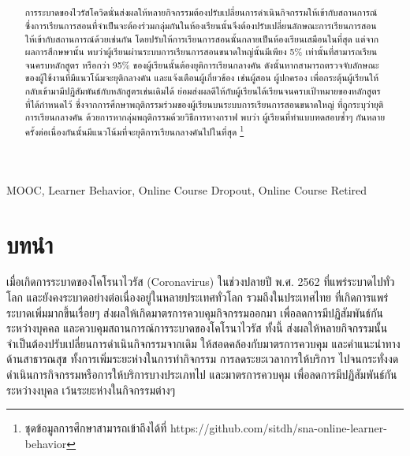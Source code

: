 \documentclass[conference]{IEEEtran}
\title{ \SNATopic }
\author{
    \IEEEauthorblockN{\Me} \newline
    \IEEEauthorblockA{\MyEmail} \newline
    \IEEEauthorblockA{ภาคการศึกษาที่ 2 ประจำปีการศึกษา 2563} \newline
    \IEEEauthorblockA{ภาควิชาวิทยาการคอมพิวเตอร์ คณะวิทยาศาสตร์} \newline
    \IEEEauthorblockA{มหาวิทยาลัยศรีนครินทรวิโรฒ ประสานมิตร}
}
\def\moocs{การเรียนการสอนขนาดใหญ่}
\def\MOOCs{ระบบ{\moocs}}
\def\dropout{ยุติการเรียนกลางคัน}
\begin{document}
    \maketitle

    \begin{abstract}
        การระบาดของไวรัสโควิดนั่นส่งผลให้หลายกิจกรรมต้องปรับเปลี่ยนการดำเนินกิจกรรมให้เข้ากับสถานการณ์
        ซึ่งการเรียนการสอนที่จำเป็นจะต้องร่วมกลุ่มกันในห้องเรียนนั้นจึงต้องปรับเปลี่ยนลักษณะการเรียนการสอนให้เข้ากับสถานการณ์ด้วยเช่นกัน
        โดยปรับให้การเรียนการสอนนั้นกลายเป็นห้องเรียนเสมือนในที่สุด แต่จากผลการสึกษษานั้น 
        พบว่าผู้เรียนผ่าน{\MOOCs}นั้นมีเพียง 5\% เท่านั้นที่สามารถเรียนจนครบหลักสูตร \cite{Feng_Tang_Liu_2019}
        หรือกว่า 95\% ของผู้เรียนนั้นต้องยุติการเรียนกลางคัน ดังนั้นหากสามารถตรวจจับลักษณะของผู้ใช้งานที่มีแนวโน้มจะยุติกลางคัน
        และแจ้งเตือนผู้เกี่ยวข้อง เช่นผู้สอน ผู้ปกครอง เพื่อกระตุ้นผู้เรียนให้กลับเข้ามามีปฏิสัมพันธ์กับหลักสูตรเช่นเดิมได้
        ย่อมส่งผลดีให้กับผู้เรียนได้เรียนจนครบเป้าหมายของหลักสูตรที่ได้กำหนดไว้ ซึ่งจากการศึกษาพฤติกรรมร่วมของผู้เรียนบน{\MOOCs} 
        ที่ถูกระบุว่า{\dropout} ด้วยการหากลุ่มพฤติกรรมด้วยวิธีการทางกราฟ พบว่า 
        ผู้เรียนที่ทำแบบทดสอบซ้ำๆ กันหลายครั้งต่อเนื่องกันนั้นมีแนวโน้มที่จะ{\dropout}ไปในที่สุด \footnote{ชุดข้อมูลการศึกษาสามารถเข้าถึงได้ที่ https://github.com/sitdh/sna-online-learner-behavior}
    \end{abstract}

    \begin{IEEEkeywords}
        MOOC, Learner Behavior, Online Course Dropout, Online Course Retired
    \end{IEEEkeywords}

    \section{บทนำ}
    เมื่อเกิดการระบาดของโคโรนาไวรัส (Coronavirus) ในช่วงปลายปี พ.ศ. 2562 \cite{covid:coronavirus}
    ที่แพร่ระบาดไปทั่วโลก และยังคงระบาดอย่างต่อเนื่องอยู่ในหลายประเทศทั่วโลก \cite{covid:worldtrendspread}
    รวมถึงในประเทศไทย \cite{covid:thailandspread} ที่เกิดการแพร่ระบาดเพิ่มมากขึ้นเรื่อยๆ
    ส่งผลให้เกิดมาตรการควบคุมกิจกรรมออกมา เพื่อลดการมีปฏิสัมพันธ์กันระหว่างบุคคล 
    และควบคุมสถานการณ์การระบาดของโคโรนาไวรัส \cite{covid:ratchakitcha:22}
    ทั้งนี้ ส่งผลให้หลายกิจกรรมนั้นจำเป็นต้องปรับเปลี่ยนการดำเนินกิจกรรมจากเดิม
    ให้สอดคล้องกับมาตรการควบคุม และคำแนะนำทางด้านสาธารณสุข \cite{covid:socialdistancing} 
    ทั้งการเพิ่มระยะห่างในการทำกิจกรรม การลดระยะเวลาการให้บริการ 
    ไปจนกระทั่งงดดำเนินการกิจกรรมหรือการให้บริการบางประเภทไป 
    และมาตรการควบคุม เพื่อลดการมีปฏิสัมพันธ์กันระหว่างงบุคล เว้นระยะห่างในกิจกรรมต่างๆ 
\end{document}
